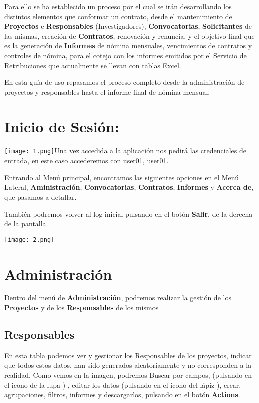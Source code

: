Para ello se ha establecido un proceso por el cual se irán desarrollando
los distintos elementos que conformar un contrato, desde el
mantenimiento de \textbf{Proyectos} e \textbf{Responsables}
(Investigadores), \textbf{Convocatorias}, \textbf{Solicitantes} de las
mismas, creación de \textbf{Contratos}, renovación y renuncia, y el
objetivo final que es la generación de \textbf{Informes} de nómina
mensuales, vencimientos de contratos y controles de nómina, para el
cotejo con los informes emitidos por el Servicio de Retribuciones que
actualmente se llevan con tablas Excel.

En esta guía de uso repasamos el proceso completo desde la
administración de proyectos y responsables hasta el informe final de
nómina mensual.

\section{Inicio de Sesión:}\label{inicio-de-sesiuxf3n}

\texttt{[image: 1.png]}Una
vez accedida a la aplicación nos pedirá las credenciales de entrada, en
este caso accederemos con user01, user01.

Entrando al Menú principal, encontramos las siguientes opciones en el
Menú Lateral, \textbf{Aministración}, \textbf{Convocatorias},
\textbf{Contratos}, \textbf{Informes} y \textbf{Acerca de}, que pasamos a detallar.

También podremos volver al log inicial pulsando en el botón
\textbf{Salir}, de la derecha de la pantalla.

\texttt{[image: 2.png]}

\section{Administración}\label{administraciuxf3n}

Dentro del menú de \textbf{Administración}, podremos realizar la gestión
de los \textbf{Proyectos} y de los \textbf{Responsables} de los mismos

\subsection{Responsables}\label{responsables}

En esta tabla podemos ver y gestionar los Responsables de los proyectos,
indicar que todos estos datos, han sido generados aleatoriamente y no
corresponden a la realidad. Como vemos en la imagen,
podremos Buscar por campos, (pulsando en el icono de la lupa ) , editar los datos (pulsando en el icono del lápiz ), crear, agrupaciones, filtros, informes y descargarlos, pulsando en el botón \textbf{Actions}.

